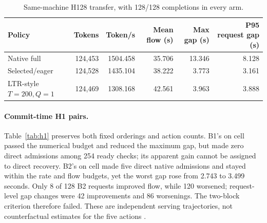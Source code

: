 \documentclass[10pt]{article}
\begin{document}
\begin{table}[t]
\centering\small
\caption{Same-machine H128 transfer, with 128/128 completions in every arm.}
\label{tab:h}
\begin{tabular}{lrrrrr}
\toprule
Policy & Tokens & Token/s & Mean flow (s) & Max gap (s) & P95 request gap (s) \\
\midrule
Native full & 124,453 & 1504.458 & 35.706 & 13.346 & 8.128 \\
Selected/eager & 124,528 & 1435.104 & 38.222 & 3.773 & 3.161 \\
LTR-style $T=200,Q=1$ & 124,469 & 1308.168 & 42.561 & 3.963 & 3.888 \\
\bottomrule
\end{tabular}
\end{table}

\paragraph{Commit-time H1 pairs.}
Table~\ref{tab:h1} preserves both fixed orderings and action counts. B1's on cell passed the numerical budget and reduced the maximum gap, but made zero direct admissions among 254 ready checks; its apparent gain cannot be assigned to direct recovery. B2's on cell made five direct native admissions and stayed within the rate and flow budgets, yet the worst gap rose from 2.743 to 3.499 seconds. Only 8 of 128 B2 requests improved flow, while 120 worsened; request-level gap changes were 42 improvements and 86 worsenings. The two-block criterion therefore failed. These are independent serving trajectories, not counterfactual estimates for the five actions \cite{h1pairs}.
\end{document}

